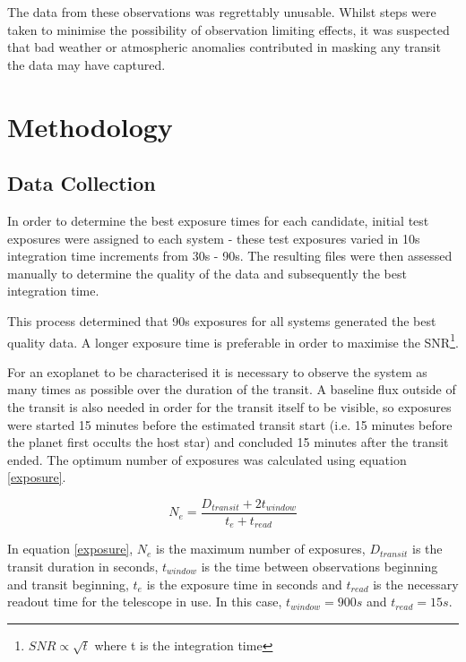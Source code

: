 \documentclass{report}
\begin{document}
The data from these observations was regrettably unusable. Whilst steps were taken to minimise the possibility of observation limiting effects, it was suspected that bad weather or atmospheric anomalies contributed in masking any transit the data may have captured. 
 

\section{Methodology}
\subsection{Data Collection}
In order to determine the best exposure times for each candidate, initial test exposures
were assigned to each system - these test exposures varied in 10s integration time
increments from 30s - 90s. The resulting files were then assessed manually to determine
the quality of the data and subsequently the best integration time.

This process determined that 90s exposures for all systems generated the best quality
data. A longer exposure time is preferable in order to maximise the SNR\footnote{$SNR 
\propto \sqrt{t}$ where t is the integration time}. 

For an exoplanet to be characterised it is necessary to observe the system as many times as possible over the duration of the transit. A baseline flux outside of the transit is also needed in order for the transit itself to be visible, so exposures were started 15 minutes before the estimated transit start (i.e. 15 minutes before the planet first occults the host star) and concluded 15 minutes after the transit ended. The optimum number of exposures was calculated using equation \ref{exposure}. 

\begin{equation} \label{exposure}
    N_{e} = \frac{D_{transit} + 2t_{window}}{t_{e} + t_{read}}
\end{equation}

In equation \ref{exposure}, $N_{e}$ is the maximum number of exposures, $D_{transit}$ is the transit duration in seconds, $t_{window}$ is the time between observations beginning and transit beginning, $t_{e}$ is the exposure time in seconds and $t_{read}$ is the necessary readout time for the telescope in use. In this case, $t_{window}=900s$ and $t_{read}=15s$.
\end{document}
